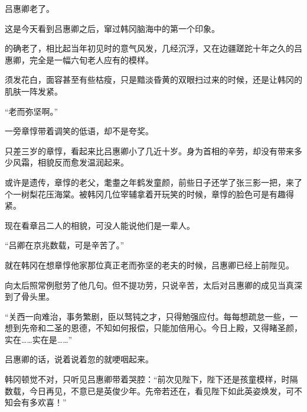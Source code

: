 吕惠卿老了。

这是今天看到吕惠卿之后，窜过韩冈脑海中的第一个印象。

的确老了，相比起当年初见时的意气风发，几经沉浮，又在边疆蹉跎十年之久的吕惠卿，完全是一幅六旬老人应有的模样。

须发花白，面容甚至有些枯瘦，只是黯淡昏黄的双眼扫过来的时候，还是让韩冈的肌肤一阵发紧。

“老而弥坚啊。”

一旁章惇带着调笑的低语，却不是夸奖。

只差三岁的章惇，看起来比吕惠卿小了几近十岁。身为首相的辛劳，却没有带来多少风霜，相貌反而愈发温润起来。

或许是遗传，章惇的老父，耄耋之年鹤发童颜，前些日子还学了张三影一把，来了个一树梨花压海棠。被韩冈几位宰辅拿着开玩笑的时候，章惇的脸色可是有趣得紧。

现在看章吕二人的相貌，可没人能说他们是一辈人。

“吕卿在京兆数载，可是辛苦了。”

就在韩冈在想章惇他家那位真正老而弥坚的老夫的时候，吕惠卿已经上前陛见。

向太后照常例慰劳了他几句。但不提功劳，只说辛苦，太后对吕惠卿的成见当真深到了骨头里。

“关西一向难治，事务繁剧，臣以驽钝之才，只得勉强应付。每每想疏怠一些，一想到先帝和二圣的恩德，不知如何报偿，只能加倍用心。今日上殿，又得睹圣颜，实在……实在是……”

吕惠卿的话，说着说着忽的就哽咽起来。

韩冈顿觉不对，只听见吕惠卿带着哭腔：“前次见陛下，陛下还是孩童模样，时隔数载，今日再见，不意已是英俊少年。先帝若还在，看见陛下如此英姿焕发，可不知会有多欢喜！”
